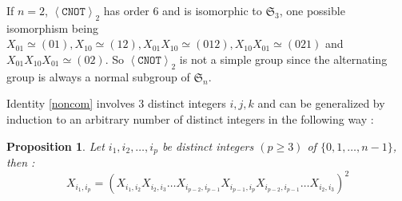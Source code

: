 \documentclass[a4paper,12pt,fleqn]{article}
\newcommand\cnot{\mathtt{CNOT}}
\newcommand\SYM[1][n]{\mathfrak{S}_{#1}}
\newcommand\XG[1][n]{\left<\cnot\right>_{#1}}
\renewcommand\geq{\geqslant}
\newtheorem{prop}[theo]{Proposition}
\begin{document}
If $n=2$, $\XG[2]$ has order 6 and is isomorphic to $\SYM[3]$, one possible isomorphism being
$X_{01}\simeq (01), X_{10}\simeq (12), X_{01}X_{10}\simeq (012), X_{10}X_{01}\simeq (021)$ and $X_{01}X_{10}X_{01}\simeq (02)$. So $\XG[2]$ is not a simple group since  the alternating group is always a normal subgroup of $\SYM$.

\medskip

Identity \eqref{noncom} involves 3 distinct integers $i,j,k$ and can be generalized by induction to an arbitrary number of distinct integers in the following way :

\begin{prop}\label{chaslesprop}
  Let $i_1,i_2,\dots,i_p$ be distinct integers $(p\geq  3)$ of $\{0,1, \dots, n-1\}$, then :
  \begin{equation}\label{chaslesform}
    X_{i_1,i_p}=\left(X_{i_1,i_2}X_{i_2,i_3}\dots X_{i_{p-2},i_{p-1}}X_{i_{p-1},i_{p}} X_{i_{p-2}, i_{p-1}}\dots X_{i_2, i_3}\right)^2
  \end{equation}
\end{prop}
\end{document}
